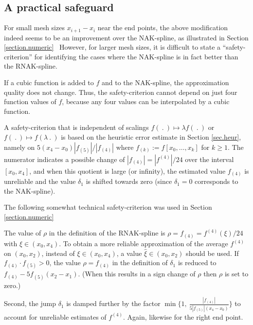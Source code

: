 \documentclass[12pt]{article}
\begin{document}

\medskip

\subsection{A practical safeguard}
For small mesh sizes $x_{i+1}-x_i$ near the end points,
the above modification indeed seems to be an improvement
over the NAK-spline, as illustrated in Section \ref{section.numeric} \
However, for larger mesh sizes, 
it is difficult to state a ``safety-criterion'' for identifying the
cases where the NAK-spline
is in fact better than the RNAK-spline.

If a cubic function is added to $f$ and to the NAK-spline,
the approximation quality does not change. Thus, the safety-criterion cannot
depend on just four function values of $f$,  because any four values can be
interpolated by a cubic function.

A safety-criterion that is independent of
scalings $f(\ .\ )\mapsto \lambda f(\ .\ )$
or $f(\ .\ )\mapsto  f(\lambda \ .\ )$ is based on the heuristic error
estimate in Section \ref{sec.heur}, namely on $5(x_4-x_0)|f_{(5)}|/|f_{(4)}|$
where $f_{(k)}:= f[x_0,\ldots,x_k]$ for $k\ge 1$.
The numerator indicates a possible change of $|f_{(4)}|=|f^{(4)}|/24$
over the interval $[x_0,x_4]$,
and when this quotient is large (or infinity),
the estimated value $f_{(4)}$ is unreliable
and the value $\delta_1$ is shifted towards zero
(since $\delta_1=0$ corresponds to the NAK-spline).

The following somewhat technical safety-criterion
was used in Section \ref{section.numeric}

\noindent
The value of $\rho$ in the definition of the
RNAK-spline is $\rho=f_{(4)}=f^{(4)}(\xi)/24$ with
$\xi\in(x_0,x_4)$. To obtain a more reliable approximation
of the average $f^{(4)}$ on $(x_0,x_2)$, instead of $\xi\in(x_0,x_4)$,
a value $\hat \xi\in(x_0,x_2)$ should be used.
If $f_{(4)}\cdot f_{(5)}>0$, the value $\rho = f_{(4)}$ in the definition
of $\delta_1$ is reduced to $f_{(4)}-5 f_{(5)} (x_2-x_1)$.
(When this results in a sign change of $\rho$
then $\rho$ is set to zero.)


Second, the jump $\delta_1$ is damped further by the factor
$\min\{1,\ \frac{|f_{(4)}|}{5 |f_{(5)}| (x_4-x_0)}\}$ to account for
unreliable estimates of $f^{(4)}$.
Again, likewise for the right end point.
\end{document}
